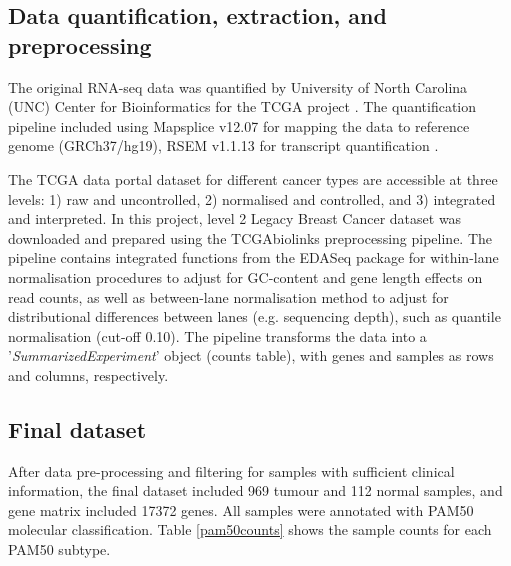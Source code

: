             
    \subsection{Data quantification, extraction, and preprocessing}
    The original RNA-seq data was quantified by University of North Carolina (UNC) Center for Bioinformatics for the TCGA project \cite{UniversityofNorthCarolinaUNCCenterforBioinfromatics2013TCGAData}. The quantification pipeline included  using Mapsplice v12.07 \cite{wang2010mapsplice} for mapping the data to reference genome (GRCh37/hg19), RSEM v1.1.13 \cite{li2011rsem} for transcript quantification \cite{UniversityofNorthCarolinaUNCCenterforBioinfromatics2013TCGAData}. 

    The TCGA data portal dataset for different cancer types are accessible at three levels: 1) raw and uncontrolled, 2) normalised and controlled, and 3) integrated and interpreted. In this project, level 2 Legacy Breast Cancer dataset was downloaded and prepared using the TCGAbiolinks preprocessing pipeline. The pipeline contains integrated functions from the EDASeq package \cite{risso2011gc} for within-lane normalisation procedures to adjust for GC-content and gene length effects on read counts, as well as between-lane normalisation method to adjust for distributional differences between lanes (e.g. sequencing depth), such as quantile normalisation (cut-off 0.10)\cite{Colaprico2016, PapaleoTCGAPackages}.  The pipeline transforms the data into a '\textit{SummarizedExperiment}' \cite{Huber2015OrchestratingBioconductor} object (counts table), with genes and samples as rows and columns, respectively. 
    
    
    \subsection{Final dataset}
    
    After data pre-processing and filtering for samples with sufficient clinical information, the final dataset included 969 tumour and 112 normal samples, and  gene matrix included 17372 genes. 
    All samples were annotated with PAM50 molecular classification. Table \ref{pam50counts} shows the sample counts for each PAM50 subtype. 
    
